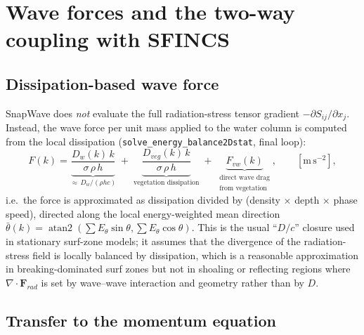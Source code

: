 \documentclass[11pt,a4paper]{article}
\newcommand{\ee}{E_\theta}
\newcommand{\code}[1]{\texttt{#1}}
\begin{document}
\section{Wave forces and the two-way coupling with SFINCS}
\label{sec:coupling}

\subsection{Dissipation-based wave force}

SnapWave does \emph{not} evaluate the full radiation-stress tensor gradient
$-\partial S_{ij}/\partial x_j$. Instead, the wave force per unit mass applied
to the water column is computed from the local dissipation
(\code{solve\_energy\_balance2Dstat}, final loop):
\begin{equation}
F(k)=\underbrace{\frac{D_w(k)\,k}{\sigma\,\rho\, h}}_{\approx\, D_w/(\rho h c)}
\;+\;\underbrace{\frac{D_{veg}(k)\,k}{\sigma\,\rho\, h}}_{\text{vegetation dissipation}}
\;+\;\underbrace{F_{vw}(k)}_{\substack{\text{direct wave drag}\\\text{from vegetation}}},
\qquad [\mathrm{m\,s^{-2}}],
\label{eq:force}
\end{equation}
i.e.\ the force is approximated as dissipation divided by (density $\times$
depth $\times$ phase speed), directed along the local energy-weighted mean
direction $\bar\theta(k)=\operatorname{atan2}(\sum\ee\sin\theta,\sum\ee\cos\theta)$.
This is the usual ``$D/c$'' closure used in stationary surf-zone models; it
assumes that the divergence of the radiation-stress field is locally balanced
by dissipation, which is a reasonable approximation in breaking-dominated surf
zones but not in shoaling or reflecting regions where $\nabla\!\cdot\!\mathbf{F}_{rad}$
is set by wave--wave interaction and geometry rather than by $D$.

\subsection{Transfer to the momentum equation}
\end{document}
